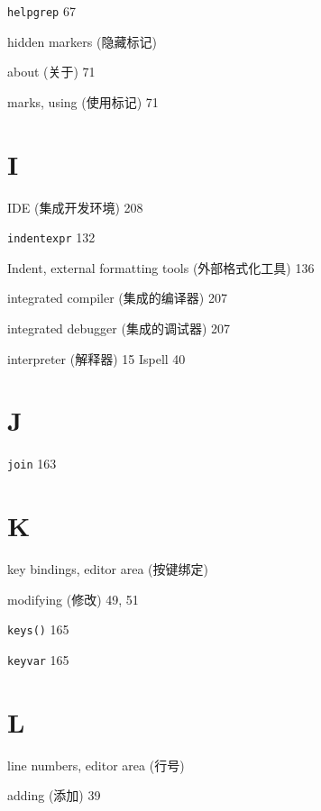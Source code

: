 \begin{multicols}{2}
\hangindent=2pc  \texttt{helpgrep} 67

\hangindent=2pc  hidden markers (隐藏标记) \par
\hangindent=2pc \quad about (关于) 71 \par
\hangindent=2pc \quad marks, using (使用标记) 71 \par

\hangindent=2pc  \section*{I}

\hangindent=2pc  IDE (集成开发环境) 208

\hangindent=2pc  \texttt{indentexpr} 132

\hangindent=2pc  Indent, external formatting tools (外部格式化工具) 136

\hangindent=2pc  integrated compiler (集成的编译器) 207

\hangindent=2pc  integrated debugger (集成的调试器) 207

\hangindent=2pc  interpreter (解释器) 15
\hangindent=2pc  Ispell 40

\hangindent=2pc  \section*{J}

\hangindent=2pc  \texttt{join} 163

\hangindent=2pc  \section*{K}

\hangindent=2pc  key bindings, editor area (按键绑定) \par
\hangindent=2pc \quad modifying (修改) 49, 51 \par

\hangindent=2pc  \texttt{keys()} 165

\hangindent=2pc  \texttt{keyvar} 165

\hangindent=2pc  \section*{L}

\hangindent=2pc  line numbers, editor area (行号) \par
\hangindent=2pc \quad adding (添加) 39 \par


\end{multicols}

